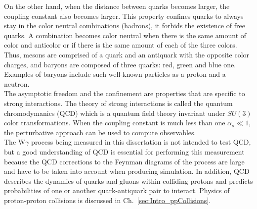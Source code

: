 On the other hand, when the distance between quarks becomes larger, the coupling constant also becomes larger. This property confines quarks to always stay in the color neutral combinations (hadrons), it forbids the existence of free quarks. A combination becomes color neutral when there is the same amount of color and anticolor or if there is the same amount of each of the three colors.  Thus, mesons are comprised of a quark and an antiquark with the opposite color charges, and baryons are composed of three quarks: red, green and blue one. Examples of baryons include such well-known particles as a proton and a neutron.\\
The asymptotic freedom and the confinement are properties that are specific to strong interactions. The theory of strong interactions is called the quantum chromodymanics (QCD) which is a quantum field theory invariant under $SU(3)$ color transformations. When the coupling constant is much less than one $\alpha_s \ll 1$, the perturbative approach can be used to compute observables.\\
The W$\gamma$ process being measured in this dissertation is not intended to test QCD, but a good understanding of QCD is essential for performing this measurement because the QCD corrections to the Feynman diagrams of the process are large and have to be taken into account when producing simulation. In addition, QCD describes the dynamics of quarks and gluons within colliding protons and predicts probabilities of one or another quark-antiquark pair to interact. Physics of proton-proton collisions is discussed in Ch.~\ref{sec:Intro_ppCollisions}. \\

